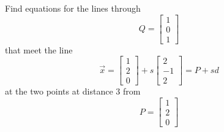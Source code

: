 \documentclass{article}
\begin{document}
\begin{Exercise}
  Find equations for the lines through
  \begin{equation*}
  Q = \left[
  \begin{matrix}
  1\\
  0\\
  1
  \end{matrix}
  \right]
  \end{equation*}
  that meet the line
  \begin{equation*}
  \vec{x} = \left[
  \begin{matrix}
  1\\
  2\\
  0
  \end{matrix}
  \right]+s \left[
  \begin{matrix}
  2\\
  -1\\
  2
  \end{matrix}
  \right] = P+sd
  \end{equation*}
  at the two points at distance $3$ from 
  \begin{equation*}
  P=\left[
  \begin{matrix}
  1\\
  2\\
  0
  \end{matrix}
  \right]
  \end{equation*}
\end{Exercise}
\end{document}
